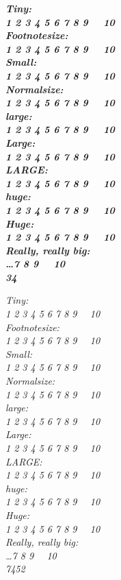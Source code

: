 \documentclass{article}
\begin{document}
\clearpage

\slshape\bfseries
\noindent
Tiny:\\ 
\tiny 1 2 3 4 5 6 7 8 9 \x\ \e\ 10 \\\normalsize
Footnotesize: \\
\footnotesize 1 2 3 4 5 6 7 8 9 \x\ \e\ 10 \\\normalsize
Small: \\
\small 1 2 3 4 5 6 7 8 9 \x\ \e\ 10 \\\normalsize
Normalsize: \\
\normalsize 1 2 3 4 5 6 7 8 9 \x\ \e\ 10 \\\normalsize
large: \\
\large 1 2 3 4 5 6 7 8 9 \x\ \e\ 10 \\\normalsize
Large: \\
\Large 1 2 3 4 5 6 7 8 9 \x\ \e\ 10 \\\normalsize
LARGE: \\
\LARGE 1 2 3 4 5 6 7 8 9 \x\ \e\ 10 \\\normalsize
huge: \\
\huge 1 2 3 4 5 6 7 8 9 \x\ \e\ 10 \\\normalsize
Huge: \\
\Huge 1 2 3 4 5 6 7 8 9 \x\ \e\ 10 \\\normalsize
Really, really big:  \\
\fontsize{50pt}{65pt}\selectfont\ldots 7 8 9 \x\ \e\
10\\\normalsize{}
\textbf{\textsl{34}}

\clearpage

\itshape
\noindent
Tiny:\\ 
\tiny 1 2 3 4 5 6 7 8 9 \x\ \e\ 10 \\\normalsize
Footnotesize: \\
\footnotesize 1 2 3 4 5 6 7 8 9 \x\ \e\ 10 \\\normalsize
Small: \\
\small 1 2 3 4 5 6 7 8 9 \x\ \e\ 10 \\\normalsize
Normalsize: \\
\normalsize 1 2 3 4 5 6 7 8 9 \x\ \e\ 10 \\\normalsize
large: \\
\large 1 2 3 4 5 6 7 8 9 \x\ \e\ 10 \\\normalsize
Large: \\
\Large 1 2 3 4 5 6 7 8 9 \x\ \e\ 10 \\\normalsize
LARGE: \\
\LARGE 1 2 3 4 5 6 7 8 9 \x\ \e\ 10 \\\normalsize
huge: \\
\huge 1 2 3 4 5 6 7 8 9 \x\ \e\ 10 \\\normalsize
Huge: \\
\Huge 1 2 3 4 5 6 7 8 9 \x\ \e\ 10 \\\normalsize
Really, really big:  \\
\fontsize{50pt}{65pt}\selectfont\ldots 7 8 9 \x\ \e\
10\\\normalsize
\textit{7452\x578\e33\e\x567}
\end{document}
